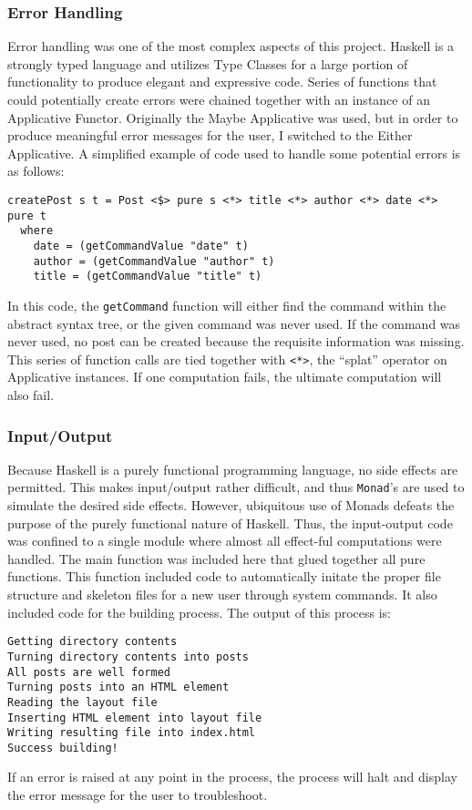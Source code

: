   \subsubsection{Error Handling}
    Error handling was one of the most complex aspects of this project. Haskell is a strongly typed language and utilizes Type Classes for a large portion of functionality to produce elegant and expressive code. Series of functions that could potentially create errors were chained together with an instance of an Applicative Functor. Originally the Maybe Applicative was used, but in order to produce meaningful error messages for the user, I switched to the Either Applicative. A simplified example of code used to handle some potential errors is as follows:
    
    \begin{verbatim}
createPost s t = Post <$> pure s <*> title <*> author <*> date <*> pure t
  where 
    date = (getCommandValue "date" t)
    author = (getCommandValue "author" t)
    title = (getCommandValue "title" t)
    \end{verbatim} 

    In this code, the \texttt{getCommand} function will either find the command within the abstract syntax tree, or the given command was never used. If the command was never used, no post can be created because the requisite information was missing. This series of function calls are tied together with \texttt{<*>}, the ``splat'' operator on Applicative instances. If one computation fails, the ultimate computation will also fail.  

  \subsubsection{Input/Output}
    Because Haskell is a purely functional programming language, no side effects are permitted. This makes input/output rather difficult, and thus \texttt{Monad}'s are used to simulate the desired side effects. However, ubiquitous use of Monads defeats the purpose of the purely functional nature of Haskell. Thus, the input-output code was confined to a single module where almost all effect-ful computations were handled. The main function was included here that glued together all pure functions. This function included code to automatically initate the proper file structure and skeleton files for a new user through system commands. It also included code for the building process. The output of this process is:

    \begin{verbatim}
Getting directory contents
Turning directory contents into posts
All posts are well formed
Turning posts into an HTML element
Reading the layout file
Inserting HTML element into layout file
Writing resulting file into index.html
Success building!
    \end{verbatim} 

    If an error is raised at any point in the process, the process will halt and display the error message for the user to troubleshoot. 